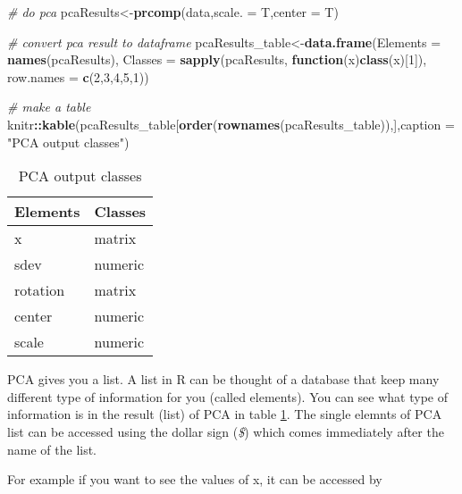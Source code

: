 \documentclass[
]{book}
\newenvironment{Shaded}{\begin{snugshade}}{\end{snugshade}}
\newcommand{\CommentTok}[1]{\textcolor[rgb]{0.56,0.35,0.01}{\textit{#1}}}
\newcommand{\ControlFlowTok}[1]{\textcolor[rgb]{0.13,0.29,0.53}{\textbf{#1}}}
\newcommand{\DataTypeTok}[1]{\textcolor[rgb]{0.13,0.29,0.53}{#1}}
\newcommand{\DecValTok}[1]{\textcolor[rgb]{0.00,0.00,0.81}{#1}}
\newcommand{\KeywordTok}[1]{\textcolor[rgb]{0.13,0.29,0.53}{\textbf{#1}}}
\newcommand{\NormalTok}[1]{#1}
\newcommand{\OperatorTok}[1]{\textcolor[rgb]{0.81,0.36,0.00}{\textbf{#1}}}
\newcommand{\StringTok}[1]{\textcolor[rgb]{0.31,0.60,0.02}{#1}}
\theoremstyle{definition}
\theoremstyle{definition}
\theoremstyle{definition}
\theoremstyle{remark}
\begin{document}
\begin{Shaded}
\begin{Highlighting}[]
\CommentTok{# do pca}
\NormalTok{pcaResults<-}\KeywordTok{prcomp}\NormalTok{(data,}\DataTypeTok{scale. =}\NormalTok{ T,}\DataTypeTok{center =}\NormalTok{ T)}

\CommentTok{# convert pca result to dataframe}
\NormalTok{pcaResults_table<-}\KeywordTok{data.frame}\NormalTok{(}\DataTypeTok{Elements =} \KeywordTok{names}\NormalTok{(pcaResults),}
           \DataTypeTok{Classes =} \KeywordTok{sapply}\NormalTok{(pcaResults, }\ControlFlowTok{function}\NormalTok{(x)}\KeywordTok{class}\NormalTok{(x)[}\DecValTok{1}\NormalTok{]),}
           \DataTypeTok{row.names =} \KeywordTok{c}\NormalTok{(}\DecValTok{2}\NormalTok{,}\DecValTok{3}\NormalTok{,}\DecValTok{4}\NormalTok{,}\DecValTok{5}\NormalTok{,}\DecValTok{1}\NormalTok{))}

\CommentTok{# make a table}
\NormalTok{knitr}\OperatorTok{::}\KeywordTok{kable}\NormalTok{(pcaResults_table[}\KeywordTok{order}\NormalTok{(}\KeywordTok{rownames}\NormalTok{(pcaResults_table)),],}\DataTypeTok{caption =} \StringTok{"PCA output classes"}\NormalTok{)}
\end{Highlighting}
\end{Shaded}

\begin{table}

\caption{\label{tab:tabpca1}PCA output classes}
\centering
\begin{tabular}[t]{l|l}
\hline
Elements & Classes\\
\hline
x & matrix\\
\hline
sdev & numeric\\
\hline
rotation & matrix\\
\hline
center & numeric\\
\hline
scale & numeric\\
\hline
\end{tabular}
\end{table}

PCA gives you a list. A list in R can be thought of a database that keep many different type of information for you (called elements). You can see what type of information is in the result (list) of PCA in table \ref{tab:tabpca1}. The single elemnts of PCA list can be accessed using the dollar sign (\emph{\$}) which comes immediately after the name of the list.

For example if you want to see the values of x, it can be accessed by
\end{document}
